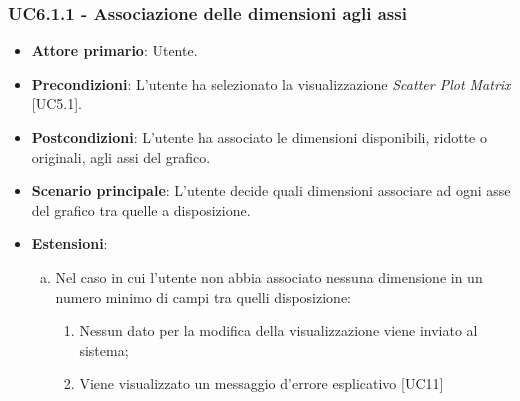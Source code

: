 \subsubsection{UC6.1.1 - Associazione delle dimensioni agli assi}
\begin{itemize}
	\item \textbf{Attore primario}: Utente.
	\item \textbf{Precondizioni}: L'utente ha selezionato la visualizzazione \textit{Scatter Plot Matrix} [UC5.1].
	\item \textbf{Postcondizioni}: L'utente ha associato le dimensioni disponibili, ridotte o originali, agli assi del grafico. 
	
	\item \textbf{Scenario principale}: L'utente decide quali dimensioni associare ad ogni asse del grafico tra quelle a disposizione.
	
		\item \textbf{Estensioni}:
	\begin{enumerate}[(a)]
		\item Nel caso in cui l'utente non abbia associato nessuna dimensione in un numero minimo di campi tra quelli disposizione:
		\begin{enumerate}[1.]
			\item Nessun dato per la modifica della visualizzazione viene inviato al sistema;
			\item Viene visualizzato un messaggio d'errore esplicativo [UC11]
		\end{enumerate}
	\end{enumerate}
\end{itemize}